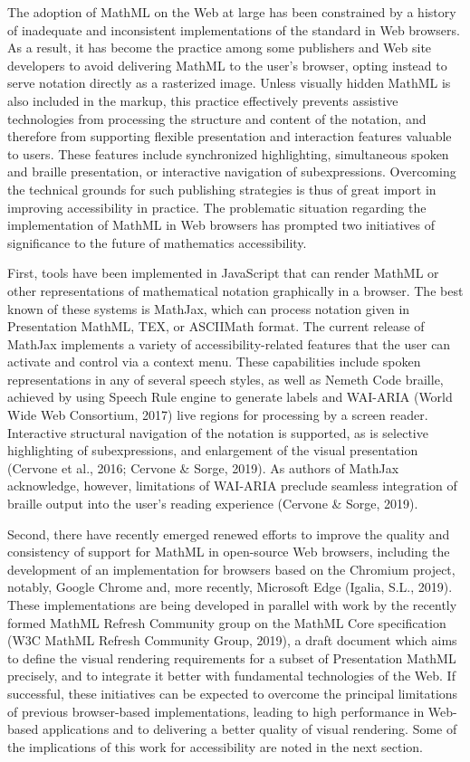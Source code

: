 \documentclass[11.5pt]{sig-alternate} %
\begin{document}
\begin{large}
The adoption of MathML on the Web at large has been constrained by a history of inadequate and inconsistent implementations of the standard in Web browsers. As a result, it has become the practice among some publishers and Web site developers to avoid delivering MathML to the user’s browser, opting instead to serve notation directly as a rasterized image. Unless visually hidden MathML is also included in the markup, this practice effectively prevents assistive technologies from processing the structure and content of the notation, and therefore from supporting flexible presentation and interaction features valuable to users. These features include synchronized highlighting, simultaneous spoken and braille presentation, or interactive navigation of subexpressions. Overcoming the technical grounds for such publishing strategies is thus of great import in improving accessibility in practice. The problematic situation regarding the implementation of MathML in Web browsers has prompted two initiatives of significance to the future of mathematics accessibility.

First, tools have been implemented in JavaScript that can render MathML or other representations of mathematical notation graphically in a browser. The best known of these systems is MathJax, which can process notation given in Presentation MathML, TEX, or ASCIIMath format. The current release of MathJax implements a variety of accessibility-related features that the user can activate and control via a context menu. These capabilities include spoken representations in any of several speech styles, as well as Nemeth Code braille, achieved by using Speech Rule engine to generate labels and WAI-ARIA (World Wide Web Consortium, 2017) live regions for processing by a screen reader. Interactive structural navigation of the notation is supported, as is selective highlighting of subexpressions, and enlargement of the visual presentation (Cervone et al., 2016; Cervone \& Sorge, 2019). As authors of MathJax acknowledge, however, limitations of WAI-ARIA preclude seamless integration of braille output into the user’s reading experience (Cervone \& Sorge, 2019).

Second, there have recently emerged renewed efforts to improve the quality and consistency of support for MathML in open-source Web browsers, including the development of an implementation for browsers based on the Chromium project, notably, Google Chrome and, more recently, Microsoft Edge (Igalia, S.L., 2019). These implementations are being developed in parallel with work by the recently formed MathML Refresh Community group on the MathML Core specification (W3C MathML Refresh Community Group, 2019), a draft document which aims to define the visual rendering requirements for a subset of Presentation MathML precisely, and to integrate it better with fundamental technologies of the Web. If successful, these initiatives can be expected to overcome the principal limitations of previous browser-based implementations, leading to high performance in Web-based applications and to delivering a better quality of visual rendering. Some of the implications of this work for accessibility are noted in the next section.



\end{large}
\end{document}

